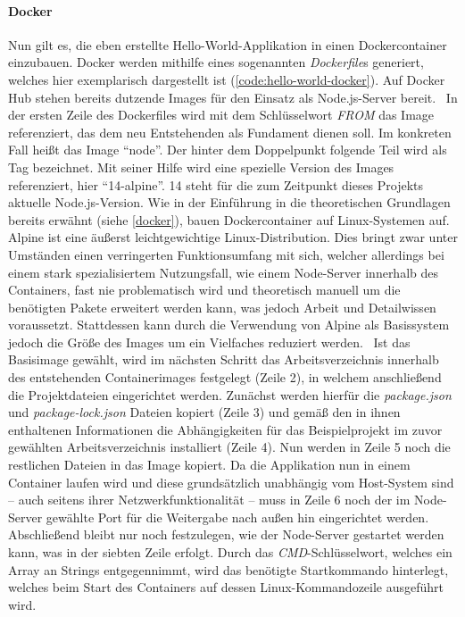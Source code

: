 \paragraph{Docker}
Nun gilt es, die eben erstellte Hello-World-Applikation in einen Dockercontainer einzubauen.
Docker werden mithilfe eines sogenannten \emph{Dockerfile}s generiert, welches hier exemplarisch dargestellt ist (\autoref{code:hello-world-docker}).
Auf Docker Hub stehen bereits dutzende Images für den Einsatz als Node.js-Server bereit.~\cite{dockerhub-node}
In der ersten Zeile des Dockerfiles wird mit dem Schlüsselwort \emph{FROM} das Image referenziert, das dem neu Entstehenden als Fundament dienen soll.
Im konkreten Fall heißt das Image \enquote{node}.
Der hinter dem Doppelpunkt folgende Teil wird als Tag bezeichnet.
Mit seiner Hilfe wird eine spezielle Version des Images referenziert, hier \enquote{14-alpine}.
14 steht für die zum Zeitpunkt dieses Projekts aktuelle Node.js-Version.
Wie in der Einführung in die theoretischen Grundlagen bereits erwähnt (siehe \autoref{docker}), bauen Dockercontainer auf Linux-Systemen auf.
Alpine ist eine äußerst leichtgewichtige Linux-Distribution.
Dies bringt zwar unter Umständen einen verringerten Funktionsumfang mit sich, welcher allerdings bei einem stark spezialisiertem Nutzungsfall, wie einem Node-Server innerhalb des Containers, fast nie problematisch wird und theoretisch manuell um die benötigten Pakete erweitert werden kann, was jedoch Arbeit und Detailwissen voraussetzt.
Stattdessen kann durch die Verwendung von Alpine als Basissystem jedoch die Größe des Images um ein Vielfaches reduziert werden.~\cite{Bailey2017}
Ist das Basisimage gewählt, wird im nächsten Schritt das Arbeitsverzeichnis innerhalb des entstehenden Containerimages festgelegt (Zeile 2), in welchem anschließend die Projektdateien eingerichtet werden.
Zunächst werden hierfür die \emph{package.json} und \emph{package-lock.json} Dateien kopiert (Zeile 3) und gemäß den in ihnen enthaltenen Informationen die Abhängigkeiten für das Beispielprojekt im zuvor gewählten Arbeitsverzeichnis installiert (Zeile 4).
Nun werden in Zeile 5 noch die restlichen Dateien in das Image kopiert.
Da die Applikation nun in einem Container laufen wird und diese grundsätzlich unabhängig vom Host-System sind -- auch seitens ihrer Netzwerkfunktionalität -- muss in Zeile 6 noch der im Node-Server gewählte Port für die Weitergabe nach außen hin eingerichtet werden.
Abschließend bleibt nur noch festzulegen, wie der Node-Server gestartet werden kann, was in der siebten Zeile erfolgt.
Durch das \emph{CMD}-Schlüsselwort, welches ein Array an Strings entgegennimmt, wird das benötigte Startkommando hinterlegt, welches beim Start des Containers auf dessen Linux-Kommandozeile ausgeführt wird.



